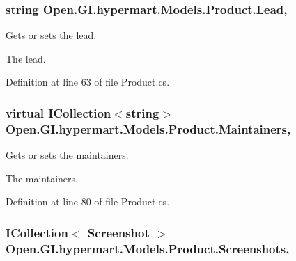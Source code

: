 \subsubsection[{Lead}]{\setlength{\rightskip}{0pt plus 5cm}string Open.\+G\+I.\+hypermart.\+Models.\+Product.\+Lead\hspace{0.3cm}{\ttfamily [get]}, {\ttfamily [set]}}\label{class_open_1_1_g_i_1_1hypermart_1_1_models_1_1_product_a646bc5e183ba8d87c06d290398e6bee6}


Gets or sets the lead. 

The lead. 

Definition at line 63 of file Product.\+cs.

\hypertarget{class_open_1_1_g_i_1_1hypermart_1_1_models_1_1_product_af39b6e12bee2265db7bbca5ecbeb116c}{}
\subsubsection[{Maintainers}]{\setlength{\rightskip}{0pt plus 5cm}virtual I\+Collection$<$string$>$ Open.\+G\+I.\+hypermart.\+Models.\+Product.\+Maintainers\hspace{0.3cm}{\ttfamily [get]}, {\ttfamily [set]}}\label{class_open_1_1_g_i_1_1hypermart_1_1_models_1_1_product_af39b6e12bee2265db7bbca5ecbeb116c}


Gets or sets the maintainers. 

The maintainers. 

Definition at line 80 of file Product.\+cs.

\hypertarget{class_open_1_1_g_i_1_1hypermart_1_1_models_1_1_product_a5fae1aafb8f9a3af27ce369d5d053df1}{}
\subsubsection[{Screenshots}]{\setlength{\rightskip}{0pt plus 5cm}I\+Collection$<$ {\bf Screenshot} $>$ Open.\+G\+I.\+hypermart.\+Models.\+Product.\+Screenshots\hspace{0.3cm}{\ttfamily [get]}, {\ttfamily [set]}}\label{class_open_1_1_g_i_1_1hypermart_1_1_models_1_1_product_a5fae1aafb8f9a3af27ce369d5d053df1}


